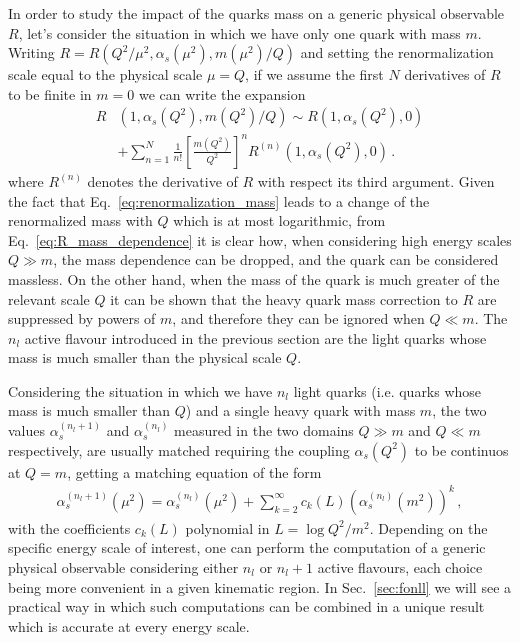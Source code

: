 %
In order to study the impact of the quarks mass on a generic physical observable $R$, let's consider
the situation in which we have only one quark with mass $m$.
Writing $R = R\left(Q^2/\mu^2, \alpha_s\left(\mu^2\right),m\left(\mu^2\right)/Q \right)$ 
and setting the renormalization scale equal to the physical scale $\mu=Q$,
if we assume the first $N$ derivatives of $R$ to be finite in $m=0$ 
we can write the expansion
\begin{align}
    \label{eq:R_mass_dependence}
    R&\left(1, \alpha_s\left(Q^2\right),m\left(Q^2\right)/Q \right) \sim
    R\left(1, \alpha_s\left(Q^2\right),0 \right)\nonumber \\
    & + \sum_{n=1}^{N}\frac{1}{n!}\left[\frac{m\left(Q^2\right)}{Q^2}\right]^n R^{(n)}\left(1,\alpha_s\left(Q^2\right),0\right)\,.
\end{align}
where $R^{(n)}$ denotes the derivative of $R$ with respect its third argument. 
Given the fact that Eq.~\ref{eq:renormalization_mass} leads to a change of the renormalized mass with $Q$ 
which is at most logarithmic, from Eq.~\ref{eq:R_mass_dependence} it is clear how, when considering 
high energy scales $Q \gg m$, the mass dependence can be dropped, and the quark can be considered massless.
%
On the other hand, when the mass of the quark is much greater of the relevant scale $Q$ it can be shown 
that the heavy quark mass correction to $R$ are suppressed by powers of $m$, and therefore they can be ignored when
$Q \ll m$. 
%
The $n_l$ active flavour introduced in the previous section are the light quarks whose mass is much smaller than
the physical scale $Q$.

%
Considering the situation in which we have $n_l$ light quarks (i.e. quarks whose mass is much smaller than $Q$)
and a single heavy quark with mass $m$, the two values $\alpha_s^{(n_l+1)}$ and $\alpha_s^{(n_l)}$ 
measured in the two domains $Q \gg m$ and $Q \ll m$ respectively,
are usually matched requiring  the coupling $\alpha_s\left(Q^2\right)$
to be continuos at $Q=m$, getting a matching equation of the form
\begin{align}
    \alpha_s^{(n_l+1)}\left(\mu^2\right) = 
    \alpha_s^{(n_l)}\left(\mu^2\right) 
    + \sum_{k=2}^{\infty} c_k\left(L\right) \left(\alpha_s^{(n_l)}\left(m^2\right)\right)^k\,,
\end{align}
with the coefficients $c_k\left(L\right)$  polynomial in $L=\log Q^2/m^2$.
Depending on the specific energy scale of interest,
one can perform the computation of a generic physical observable considering either $n_l$ or $n_l + 1$ active flavours,
each choice being more convenient in a given kinematic region. 
In Sec.~\ref{sec:fonll} we will see a practical way in which such computations can be combined in a unique result which
is accurate at every energy scale.



